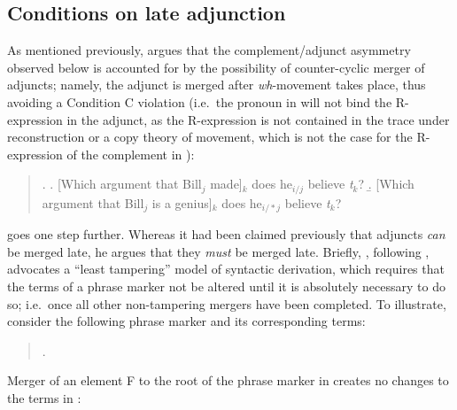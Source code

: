 \subsection{Conditions on late adjunction}
As mentioned previously, \citet{lebeaux1988} argues that the complement/adjunct asymmetry observed below is accounted for by the possibility of counter-cyclic merger of adjuncts; namely, the adjunct is merged after {\it wh}-movement takes place, thus avoiding a Condition C violation (i.e.\ the pronoun in \Next[a] will not bind the R-expression in the adjunct, as the R-expression is not contained in the trace under reconstruction or a copy theory of movement, which is not the case for the R-expression of the complement in \Next[b]):

\singlespacing
\begin{quote}
\begin{samepage}
\ex.
\a. [Which argument that Bill$_{j}$ made]$_{k}$ does he$_{i/j}$ believe \textit{t}$_{k}$?
\b. [Which argument that Bill$_{j}$ is a genius]$_{k}$ does he$_{i/*j}$ believe \textit{t}$_{k}$?

\end{samepage}
\end{quote}
\onehalfspacing

\citet{stepanov2000} goes one step further. Whereas it had been claimed previously that adjuncts {\it can} be merged late, he argues that they {\it must} be merged late. Briefly, \citeauthor{stepanov2000}, following \citet{watanabe1995}, advocates a ``least tampering'' model of syntactic derivation, which requires that the terms of a phrase marker not be altered until it is absolutely necessary to do so; i.e.\ once all other non-tampering mergers have been completed. To illustrate, consider the following phrase marker and its corresponding terms:

\singlespacing
\begin{quote}
\ex. \label{stepanov_terms_ex}

\end{quote}
\onehalfspacing
Merger of an element F to the root of the phrase marker in \Last[a] creates no changes to the terms in \Last[b]:

